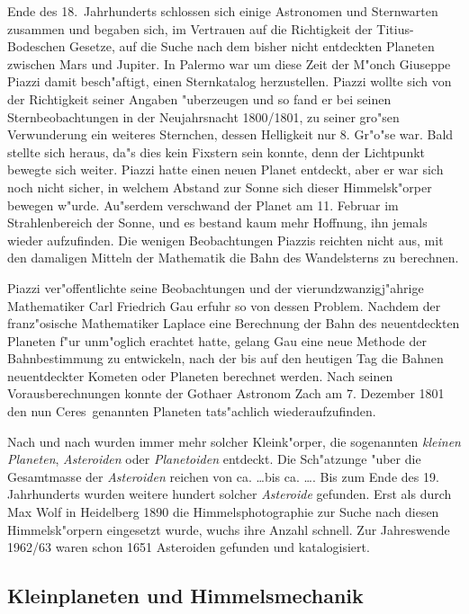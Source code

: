 Ende des 18.~Jahrhunderts schlossen sich einige Astronomen und Sternwarten zusammen
und begaben sich, im Vertrauen auf die Richtigkeit der Titius-Bodeschen Gesetze, auf
die Suche nach dem bisher nicht entdeckten Planeten zwischen Mars und Jupiter. In
Palermo war um diese Zeit der M"onch Giuseppe Piazzi damit besch"aftigt, einen
Sternkatalog herzustellen. Piazzi wollte sich von der Richtigkeit seiner Angaben
"uberzeugen und so fand er bei seinen Sternbeobachtungen in der Neujahrsnacht
1800/1801, zu seiner gro"sen Verwunderung ein weiteres Sternchen, dessen Helligkeit
nur 8. Gr"o"se war. Bald stellte sich heraus, da"s dies kein Fixstern sein konnte,
denn der Lichtpunkt bewegte sich weiter. Piazzi hatte einen neuen Planet entdeckt,
aber er war sich noch nicht sicher, in welchem Abstand zur Sonne sich dieser
Himmelsk"orper bewegen w"urde. Au"serdem verschwand der Planet am 11. Februar im
Strahlenbereich der Sonne, und es bestand kaum mehr Hoffnung, ihn jemals wieder
aufzufinden. Die wenigen Beobachtungen Piazzis reichten nicht aus, mit den
damaligen Mitteln der Mathematik die Bahn des Wandelsterns zu berechnen.

Piazzi ver"offentlichte seine Beobachtungen und der vierundzwanzigj"ahrige Mathematiker
Carl Friedrich Gau\3 erfuhr so von dessen Problem. Nachdem der franz"osische
Mathematiker Laplace eine Berechnung der Bahn des neuentdeckten Planeten f"ur
unm"oglich erachtet hatte, gelang Gau\3 ei\-ne neue Methode der Bahnbestimmung zu
entwickeln, nach der bis auf den heutigen Tag die Bahnen neuentdeckter Kometen oder
Planeten berechnet werden. Nach seinen Vorausberechnungen konnte der Gothaer Astronom
Zach am 7. Dezember 1801 den nun \glqq Ceres\grqq\ genannten Planeten tats"achlich
wiederaufzufinden. 

Nach und nach wurden immer mehr solcher Kleink"orper, die sogenannten {\it kleinen
Planeten}, {\it Asteroiden} oder {\it Planetoiden} entdeckt. Die Sch"atzunge "uber
die Gesamtmasse der {\it Asteroiden} reichen von ca. \dots bis ca. \dots. Bis zum
Ende des 19. Jahrhunderts wurden weitere hundert solcher {\it Asteroide} gefunden.
Erst als durch Max Wolf in Heidelberg 1890 die Himmelsphotographie zur Suche nach
diesen Himmelsk"orpern eingesetzt wurde, wuchs ihre Anzahl schnell. Zur Jahreswende
1962/63 waren schon 1651 Asteroiden gefunden und katalogisiert.

\subsection{Kleinplaneten und Himmelsmechanik}

